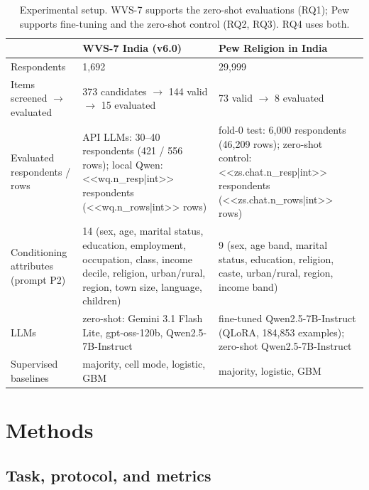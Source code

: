 \documentclass[conference]{IEEEtran}
\begin{document}
\begin{table}[!t]
\caption{Experimental setup. WVS-7 supports the zero-shot evaluations (RQ1); Pew supports fine-tuning and the zero-shot control (RQ2, RQ3). RQ4 uses both.}
\label{tab:setup}
\centering
\footnotesize
\begin{tabular}{@{}p{3.3cm}p{6.7cm}p{6.7cm}@{}}
\toprule
 & \textbf{WVS-7 India (v6.0)} & \textbf{Pew Religion in India} \\
\midrule
Respondents & 1{,}692 & 29{,}999 \\
Items screened $\rightarrow$ evaluated & 373 candidates $\rightarrow$ 144 valid $\rightarrow$ 15 evaluated & 73 valid $\rightarrow$ 8 evaluated \\
Evaluated respondents / rows & API LLMs: 30--40 respondents (421 / 556 rows); local Qwen: <<wq.n_resp|int>> respondents (<<wq.n_rows|int>> rows) & fold-0 test: 6{,}000 respondents (46{,}209 rows); zero-shot control: <<zs.chat.n_resp|int>> respondents (<<zs.chat.n_rows|int>> rows) \\
Conditioning attributes (prompt P2) & 14 (sex, age, marital status, education, employment, occupation, class, income decile, religion, urban/rural, region, town size, language, children) & 9 (sex, age band, marital status, education, religion, caste, urban/rural, region, income band) \\
LLMs & zero-shot: Gemini 3.1 Flash Lite, gpt-oss-120b, Qwen2.5-7B-Instruct & fine-tuned Qwen2.5-7B-Instruct (QLoRA, 184{,}853 examples); zero-shot Qwen2.5-7B-Instruct \\
Supervised baselines & majority, cell mode, logistic, GBM & majority, logistic, GBM \\
\bottomrule
\end{tabular}
\end{table}

\section{Methods}

\subsection{Task, protocol, and metrics}
\end{document}
